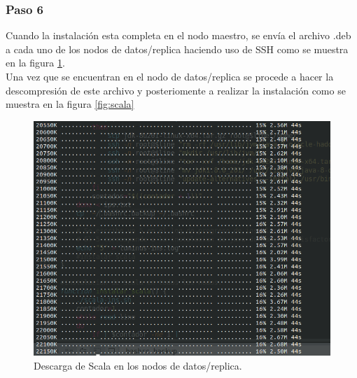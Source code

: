 \subsubsection{Paso 6}
Cuando la instalación esta completa en el nodo maestro, se envía el archivo .deb a cada uno de los nodos de datos/replica haciendo uso de SSH como se muestra en la figura \ref{fig:scalaesclavo}.\\
Una vez que se encuentran en el nodo de datos/replica se procede a hacer la descompresión de este archivo y posteriomente a realizar la instalación como se muestra en la figura \ref{fig:scala} 
\begin{figure}[H]
	\hypertarget{fig:scalaesclavo}{\hspace{1pt}}
	\begin{center}	
		\includegraphics[width=.7\textwidth]{capitulo5/images/descargascalaesclavo.png}
		\caption{Descarga de Scala en los nodos de datos/replica.}
		\label{fig:scalaesclavo}
	\end{center}
\end{figure}
